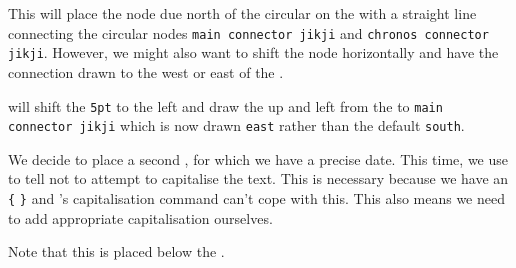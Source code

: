 \documentclass[10pt,british,a4paper]{ltxdoc}
\newcommand*\pkg[1]{\textpkg{#1}}
\begin{document}
This will place the  node due north of the circular  on the  with a straight line connecting the circular  nodes \texttt{main connector jikji} and \texttt{chronos connector jikji}.
However, we might also want to shift the  node horizontally and have the connection drawn to the west or east of the .
\begin{chronoscode}
\end{chronoscode}
will shift the  \texttt{5pt} to the left and draw the  up and left from the  to \texttt{main connector jikji} which is now drawn \texttt{east} rather than the default \texttt{south}.

We decide to place a second , for which we have a precise date.
This time, we use  to tell \pkg{chronos} not to attempt to capitalise the text.
This is necessary because we have an \texttt{\{} \texttt{\}} and \pkg{chronos}'s capitalisation command can't cope with this.
This also means we need to add appropriate capitalisation ourselves.
\begin{chronoscode}[as,is]
\end{chronoscode}
Note that this  is placed below the .
\end{document}
